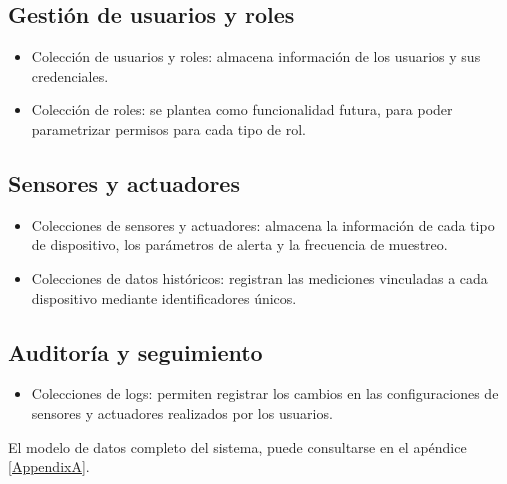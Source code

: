 \subsection{Gestión de usuarios y roles}

\begin{itemize}
    \item Colección de usuarios y roles: almacena información de los usuarios y sus
          credenciales.
    \item Colección de roles: se plantea como funcionalidad futura, para poder
          parametrizar permisos para cada tipo de rol.
\end{itemize}

\subsection{Sensores y actuadores}
\begin{itemize}
    \item Colecciones de sensores y actuadores: almacena la información de cada tipo de
          dispositivo, los parámetros de alerta y la frecuencia de muestreo.
    \item Colecciones de datos históricos: registran las mediciones vinculadas a cada
          dispositivo mediante identificadores únicos.
\end{itemize}

\subsection{Auditoría y seguimiento}
\begin{itemize}
    \item Colecciones de logs: permiten registrar los cambios en las configuraciones de
          sensores y actuadores realizados por los usuarios.
\end{itemize}

El modelo de datos completo del sistema, puede consultarse en el apéndice
\ref{AppendixA}.



